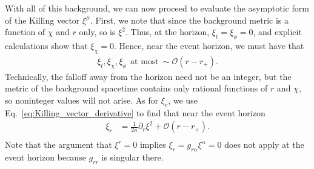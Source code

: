 \documentclass[aps,prx,amsmath,floats,floatfix,twocolumn,
  superscriptaddress,nofootinbib,showpacs]{revtex4-1}
\begin{document}
With all of this background, we can now proceed to evaluate the asymptotic form of the Killing vector $\xi^{\mu}$. First, we note that since the background metric is a function of $\chi$ and $r$ only, so is $\xi^2$. 
Thus, at the horizon, $ \xi_{t} = \xi_{\phi} = 0$, and  explicit calculations show that $ \xi_{\chi} = 0$. 
Hence, near the event horizon, we must have that
\begin{equation}
\begin{split}
\xi_{t}, \xi_{\chi}, \xi_{\phi} ~~ \text{at most} ~ \sim \mathcal{O}(r-r_+).
\end{split}
\end{equation}
Technically, the falloff away from the horizon need not be an integer, but the metric of the background spacetime contains only rational functions of $r$ and $\chi$, so noninteger values will not arise.
As for $\xi_{r}$, we use Eq.~\eqref{eq:Killing_vector_derivative} to find that near the event horizon
\begin{equation}
\begin{split}
\xi_{r} & = \frac{1}{2 \kappa} \partial_r \xi^2 + \mathcal{O}(r-r_+). \\
\end{split}
\end{equation}
Note that the argument that $\xi^r = 0$ implies $\xi_r = g_{r \alpha} \xi^{\alpha} = 0 $ does not apply at the event horizon because $g_{rr}$ is singular there.
\end{document}
